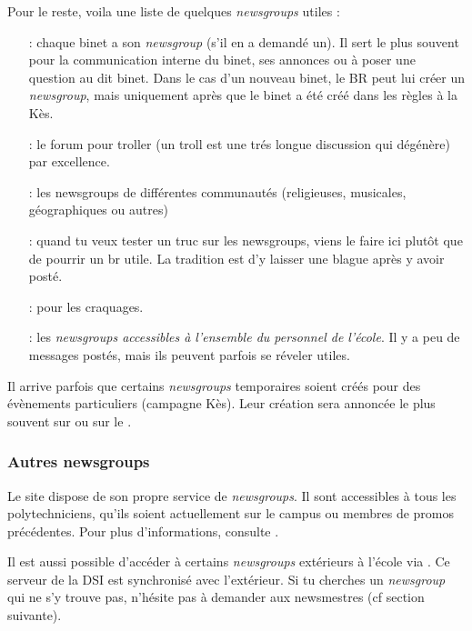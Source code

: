 Pour le reste, voila une liste de quelques \emph{newsgroups} utiles :
\begin{itemize}
\item[\ngname{br.binet.ton\_binet} :] chaque binet a son \emph{newsgroup} (s'il en a demandé un). Il sert le plus souvent pour la communication interne du binet, ses annonces ou à poser une question au dit binet. Dans le cas d'un nouveau binet, le BR peut lui créer un \emph{newsgroup}, mais uniquement après que le binet a été créé dans les règles à la Kès.

\item[\ngname{br.binet.polemix} :] le forum pour troller (un troll est une trés longue discussion qui dégénère) par excellence.
                          
\item[\ngname{br.communauté.*} :] les newsgroups de différentes communautés (religieuses, musicales, géographiques ou autres)

\item[\ngname{br.test} :] quand tu veux tester un truc sur les newsgroups, viens le faire ici plutôt que de pourrir un br utile. La tradition est  d'y laisser une blague après y avoir posté.

 \item[\ngname{br.trash} :] pour les craquages.
 
 \item[\ngname{public.*} :] les \emph{newsgroups accessibles à l'ensemble du personnel de l'école}.
                   Il y a peu de messages postés, mais ils peuvent parfois se réveler utiles.
\end{itemize}

Il arrive parfois que certains \emph{newsgroups} temporaires soient créés pour des évènements particuliers (campagne Kès). Leur création sera annoncée
le plus souvent sur \fkz ou sur le .

\subsubsection{Autres newsgroups}
Le site  dispose de son propre service de \emph{newsgroups}. Il sont
accessibles à tous les polytechniciens, qu'ils soient actuellement sur le campus ou membres de
promos précédentes. Pour plus d'informations, consulte .

Il est aussi possible d'accéder à certains \emph{newsgroups} extérieurs à l'école via . Ce serveur de la DSI est synchronisé avec
l'extérieur. Si tu cherches un \emph{newsgroup} qui ne s'y trouve pas, n'hésite pas à demander aux newsmestres (cf section suivante).

